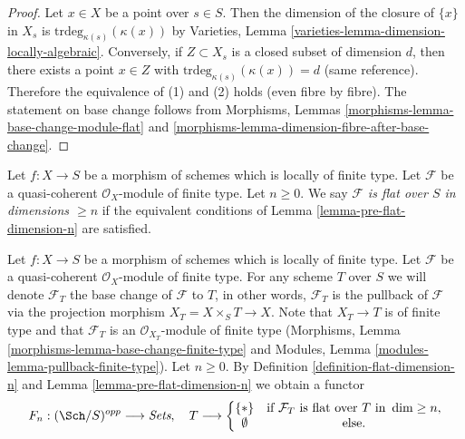 \begin{proof}
Let $x \in X$ be a point over $s \in S$.
Then the dimension of the closure of $\{x\}$ in $X_s$
is $\text{trdeg}_{\kappa(s)}(\kappa(x))$ by
Varieties, Lemma \ref{varieties-lemma-dimension-locally-algebraic}.
Conversely, if $Z \subset X_s$ is a closed subset
of dimension $d$, then there exists a point $x \in Z$
with $\text{trdeg}_{\kappa(s)}(\kappa(x)) = d$ (same reference).
Therefore the equivalence of (1) and (2) holds (even fibre by fibre).
The statement on base change follows from
Morphisms, Lemmas \ref{morphisms-lemma-base-change-module-flat} and
\ref{morphisms-lemma-dimension-fibre-after-base-change}.
\end{proof}

\begin{definition}
\label{definition-flat-dimension-n}
Let $f : X \to S$ be a morphism of schemes which is locally of finite type.
Let $\mathcal{F}$ be a quasi-coherent $\mathcal{O}_X$-module of finite type.
Let $n \geq 0$.
We say {\it $\mathcal{F}$ is flat over $S$ in dimensions $\geq n$}
if the equivalent conditions of Lemma \ref{lemma-pre-flat-dimension-n}
are satisfied.
\end{definition}

\begin{situation}
\label{situation-flat-dimension-n}
Let $f : X \to S$ be a morphism of schemes which is locally of finite type.
Let $\mathcal{F}$ be a quasi-coherent $\mathcal{O}_X$-module of finite
type. For any scheme $T$ over $S$ we will denote $\mathcal{F}_T$ the
base change of $\mathcal{F}$ to $T$, in other words, $\mathcal{F}_T$
is the pullback of $\mathcal{F}$ via the projection morphism
$X_T = X \times_S T \to X$. Note that $X_T \to T$ is of finite type
and that $\mathcal{F}_T$ is an $\mathcal{O}_{X_T}$-module
of finite type (Morphisms, Lemma
\ref{morphisms-lemma-base-change-finite-type} and
Modules, Lemma \ref{modules-lemma-pullback-finite-type}).
Let $n \geq 0$. By Definition \ref{definition-flat-dimension-n} and
Lemma \ref{lemma-pre-flat-dimension-n} we obtain a functor
\begin{equation}
\label{equation-flat-dimension-n}
F_n : (\Sch/S)^{opp} \longrightarrow \textit{Sets}, \quad
T \longrightarrow \left\{
\begin{matrix}
\{*\} & \text{if }\mathcal{F}_T\text{ is flat over }T\text{ in }\dim \geq n, \\
\emptyset & \text{else.}
\end{matrix}
\right.
\end{equation}
\end{situation}

